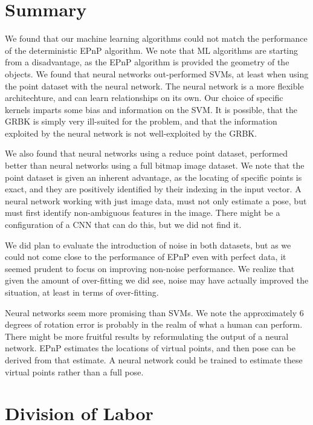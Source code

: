 \documentclass[journal]{IEEEtran}
\begin{document}
\section{Summary}
We found that our machine learning algorithms could not match the performance of the deterministic EPnP algorithm. We note that ML algorithms are starting from a disadvantage, as the EPnP algorithm is provided the geometry of the objects. We found that neural networks out-performed SVMs, at least when using the point dataset with the neural network. The neural network is a more flexible architechture, and can learn relationships on its own. Our choice of specific kernels imparts some bias and information on the SVM. It is possible, that the GRBK is simply very ill-suited for the problem, and that the information exploited by the neural network is not well-exploited by the GRBK.

We also found that neural networks using a reduce point dataset, performed better than neural networks using a full bitmap image dataset. We note that the point dataset is given an inherent advantage, as the locating of specific points is exact, and they are positively identified by their indexing in the input vector. A neural network working with just image data, must not only estimate a pose, but must first identify non-ambiguous features in the image. There might be a configuration of a CNN that can do this, but we did not find it.

We did plan to evaluate the introduction of noise in both datasets, but as we could not come close to the performance of EPnP even with perfect data, it seemed prudent to focus on improving non-noise performance. We realize that given the amount of over-fitting we did see, noise may have actually improved the situation, at least in terms of over-fitting.

Neural networks seem more promising than SVMs. We note the approximately 6 degrees of rotation error is probably in the realm of what a human can perform. There might be more fruitful results by reformulating the output of a neural network. EPnP estimates the locations of virtual points, and then pose can be derived from that estimate. A neural network could be trained to estimate these virtual points rather than a full pose.

\section{Division of Labor}
\end{document}
